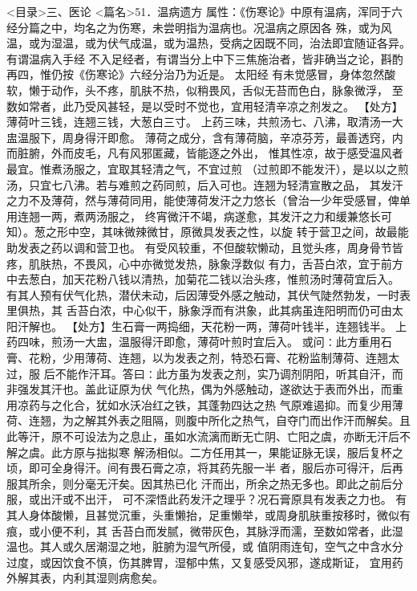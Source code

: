 \documentclass[a4paper,12pt,UTF8,twoside]{ctexbook}
\begin{document}
<目录>三、医论
<篇名>51．温病遗方
属性：《伤寒论》中原有温病，浑同于六经分篇之中，均名之为伤寒，未尝明指为温病也。况温病之原因各 
殊，或为风温，或为湿温，或为伏气成温，或为温热，受病之因既不同，治法即宜随证各异。有谓温病入手经 
不入足经者，有谓当分上中下三焦施治者，皆非确当之论，斟酌再四，惟仍按《伤寒论》六经分治乃为近是。 
太阳经 
有未觉感冒，身体忽然酸软，懒于动作，头不疼，肌肤不热，似稍畏风，舌似无苔而色白，脉象微浮， 
至数如常者，此乃受风甚轻，是以受时不觉也，宜用轻清辛凉之剂发之。 
【处方】薄荷叶三钱，连翘三钱，大葱白三寸。 
上药三味，共煎汤七、八沸，取清汤一大盅温服下，周身得汗即愈。 
薄荷之成分，含有薄荷脑，辛凉芬芳，最善透窍，内而脏腑，外而皮毛，凡有风邪匿藏，皆能逐之外出， 
惟其性凉，故于感受温风者最宜。惟煮汤服之，宜取其轻清之气，不宜过煎 
（过煎即不能发汗），是以以之煎汤，只宜七八沸。若与难煎之药同煎，后入可也。连翘为轻清宣散之品， 
其发汗之力不及薄荷，然与薄荷同用，能使薄荷发汗之力悠长（曾治一少年受感冒，俾单用连翘一两，煮两汤服之， 
终宵微汗不竭，病遂愈，其发汗之力和缓兼悠长可知）。葱之形中空，其味微辣微甘，原微具发表之性，以旋 
转于营卫之间，故最能助发表之药以调和营卫也。 
有受风较重，不但酸软懒动，且觉头疼，周身骨节皆疼，肌肤热，不畏风，心中亦微觉发热，脉象浮数似 
有力，舌苔白浓，宜于前方中去葱白，加天花粉八钱以清热，加菊花二钱以治头疼，惟煎汤时薄荷宜后入。 
有其人预有伏气化热，潜伏未动，后因薄受外感之触动，其伏气陡然勃发，一时表里俱热，其 
舌苔白浓，中心似干，脉象浮而有洪象，此其病虽连阳明而仍可由太阳汗解也。 
【处方】生石膏一两捣细，天花粉一两，薄荷叶钱半，连翘钱半。 
上药四味，煎汤一大盅，温服得汗即愈，薄荷叶煎时宜后入。 
或问∶此方重用石膏、花粉，少用薄荷、连翘，以为发表之剂，特恐石膏、花粉监制薄荷、连翘太过，服 
后不能作汗耳。答曰∶此方虽为发表之剂，实乃调剂阴阳，听其自汗，而非强发其汗也。盖此证原为伏 
气化热，偶为外感触动，遂欲达于表而外出，而重用凉药与之化合，犹如水沃冶红之铁，其蓬勃四达之热 
气原难遏抑。而复少用薄荷、连翘，为之解其外表之阻隔，则腹中所化之热气，自夺门而出作汗而解矣。且 
此等汗，原不可设法为之息止，虽如水流漓而断无亡阴、亡阳之虞，亦断无汗后不解之虞。此方原与拙拟寒 
解汤相似。二方任用其一，果能证脉无误，服后复杯之顷，即可全身得汗。间有畏石膏之凉，将其药先服一半 
者，服后亦可得汗，后再服其所余，则分毫无汗矣。因其热已化 
汗而出，所余之热无多也。即此之前后分服，或出汗或不出汗， 
可不深悟此药发汗之理乎？况石膏原具有发表之力也。 
有其人身体酸懒，且甚觉沉重，头重懒抬，足重懒举，或周身肌肤重按移时，微似有痕，或小便不利，其 
舌苔白而发腻，微带灰色，其脉浮而濡，至数如常者，此湿温也。其人或久居潮湿之地，脏腑为湿气所侵，或 
值阴雨连旬，空气之中含水分过度，或因饮食不慎，伤其脾胃，湿郁中焦，又复感受风邪，遂成斯证， 
宜用药外解其表，内利其湿则病愈矣。 
\end{document}
